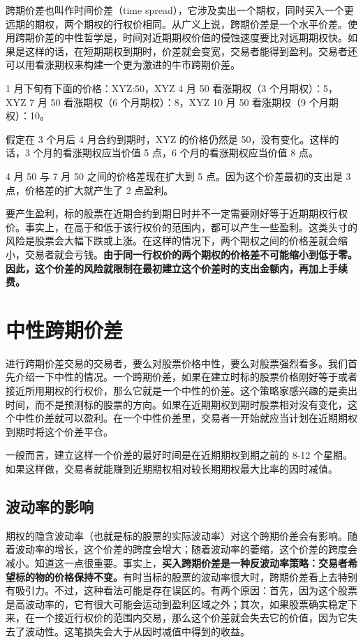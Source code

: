 \documentclass{article}
\begin{document}
跨期价差也叫作时间价差（time spread），它涉及卖出一个期权，同时买入一个更远期的期权，两个期权的行权价相同。从广义上说，跨期价差是一个水平价差。使用跨期价差的中性哲学是，时间对近期期权价值的侵蚀速度要比对远期期权快。如果是这样的话，在短期期权到期时，价差就会变宽，交易者能得到盈利。交易者还可以用看涨期权来构建一个更为激进的牛市跨期价差。

1 月下旬有下面的价格：XYZ:50，XYZ 4 月 50 看涨期权（3 个月期权）：5，XYZ 7 月 50 看涨期权（6 个月期权）：8，XYZ 10 月 50 看涨期权（9 个月期权）：10。

假定在 3 个月后 4 月合约到期时，XYZ 的价格仍然是 50，没有变化。这样的话，3 个月的看涨期权应当价值 5 点，6 个月的看涨期权应当价值 8 点。

4 月 50 与 7 月 50 之间的价格差现在扩大到 5 点。因为这个价差最初的支出是 3 点，价格差的扩大就产生了 2 点盈利。

要产生盈利，标的股票在近期合约到期日时并不一定需要刚好等于近期期权行权价。事实上，在高于和低于该行权价的范围内，都可以产生一些盈利。这类头寸的风险是股票会大幅下跌或上涨。在这样的情况下，两个期权之间的价格差就会缩小，交易者就会亏钱。\textbf{由于同一行权价的两个期权的价格差不可能缩小到低于零。因此，这个价差的风险就限制在最初建立这个价差时的支出金额内，再加上手续费。}

\section{中性跨期价差}
进行跨期价差交易的交易者，要么对股票价格中性，要么对股票强烈看多。我们首先介绍一下中性的情况。一个跨期价差，如果在建立时标的股票价格刚好等于或者接近所用期权的行权价，那么它就是一个中性的价差。这个策略家感兴趣的是卖出时间，而不是预测标的股票的方向。如果在近期期权到期时股票相对没有变化，这个中性价差就可以盈利。在一个中性价差里，交易者一开始就应当计划在近期期权到期时将这个价差平仓。

一般而言，建立这样一个价差的最好时间是在近期期权到期之前的 8-12 个星期。如果这样做，交易者就能赚到近期期权相对较长期期权最大比率的因时减值。
\subsection{波动率的影响}
期权的隐含波动率（也就是标的股票的实际波动率）对这个跨期价差会有影响。随着波动率的增长，这个价差的跨度会增大；随着波动率的萎缩，这个价差的跨度会减小。知道这一点很重要。事实上，\textbf{买入跨期价差是一种反波动率策略：交易者希望标的物的价格保持不变。}有时当标的股票的波动率很大时，跨期价差看上去特别有吸引力。不过，这种看法可能是存在误区的。有两个原因：首先，因为这个股票是高波动率的，它有很大可能会运动到盈利区域之外；其次，如果股票确实稳定下来，在一个接近行权价的范围内交易，那么这个价差就会失去它的价值，因为它失去了波动性。这笔损失会大于从因时减值中得到的收益。
\end{document}
